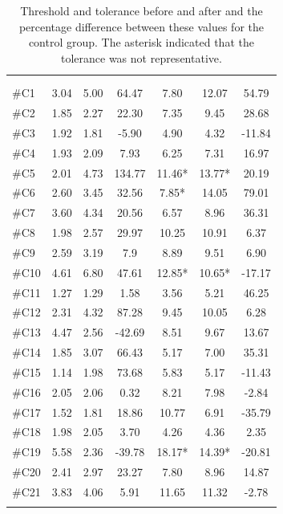 \begin{longtable} {l|c|c|c|c|c|c}
 \rowcolor[HTML]{C0C0C0} 
  \color[HTML]{000000}{} & 
 \multicolumn{3}{c|}{ \color[HTML]{000000}{\textbf{Threshold}}} & \multicolumn{3}{c}{ \color[HTML]{000000}{\textbf{Tolerance}}}  	\\  \rule{0pt}{3ex} 
  \cellcolor[HTML]{C0C0C0}{} &
 \multicolumn{1}{c|}{ \cellcolor[HTML]{C0C0C0}{Pre [KgF]}} & \multicolumn{1}{c|}{ \cellcolor[HTML]{C0C0C0}{Post [KgF]}} 
 & \multicolumn{1}{c}{ \cellcolor[HTML]{C0C0C0}{\textcolor[HTML]{C0C0C0}{0}Diff [\%]\textcolor[HTML]{C0C0C0}{0}}}
 & \multicolumn{1}{|c|}{ \cellcolor[HTML]{C0C0C0}{Pre [KgF]}} 
 & \multicolumn{1}{c|}{ \cellcolor[HTML]{C0C0C0}{Post [KgF]}} 
 & \multicolumn{1}{c}{ \cellcolor[HTML]{C0C0C0}{\textcolor[HTML]{C0C0C0}{0}Diff [\%]\textcolor[HTML]{C0C0C0}{0}}}  	\\ \hline   
\#C1 & 3.04	& 5.00	&	64.47	& 7.80	& 	12.07 &	54.79\\ \hline
\#C2 & 1.85 	& 2.27	&	22.30	& 7.35	& 	9.45 & 28.68	\\ \hline
\#C3 & 1.92 	& 1.81	&	-5.90	& 4.90	& 	4.32 & -11.84	\\ \hline
\#C4 & 1.93 	& 2.09	&	7.93		& 6.25	&	7.31 & 16.97	\\ \hline
\#C5 & 2.01 	& 4.73 	& 	134.77	& 11.46* 	& 13.77* & 20.19		\\ \hline
\#C6 & 2.60 	& 3.45	& 	32.56		& 7.85*	& 14.05 & 79.01		\\ \hline	
\#C7 & 3.60 & 4.34	& 	20.56		& 6.57 & 8.96  &	36.31 \\ \hline
\#C8 & 1.98 & 2.57	& 	29.97		& 10.25	& 10.91 &	6.37	\\ \hline
\#C9 & 2.59 & 3.19 	& 	7.9		& 8.89	& 9.51 & 6.90		\\ \hline
\#C10 & 4.61 & 6.80	& 	47.61		& 12.85*	& 10.65* & -17.17 \\ \hline
\#C11 & 1.27 & 1.29 	& 	1.58		& 3.56	& 5.21 &  46.25\\ \hline
\#C12 & 2.31 & 4.32 	& 	87.28	& 9.45 & 10.05 & 6.28 \\ \hline
\#C13 & 4.47 & 2.56 	& 	-42.69	& 8.51 & 9.67 & 13.67 \\ \hline
\#C14 & 1.85 & 3.07 & 	66.43	 & 5.17 & 7.00 & 35.31 \\ \hline
\#C15 & 1.14 & 1.98 & 	73.68 & 5.83 & 5.17 & -11.43 \\ \hline
\#C16 & 2.05 & 2.06 & 	0.32 & 8.21 & 7.98 & -2.84 \\ \hline
\#C17 & 1.52 & 1.81 &	18.86 & 10.77 & 6.91 & -35.79 \\ \hline
\#C18 & 1.98 & 2.05 & 	3.70 & 4.26  &  4.36 & 2.35 \\ \hline
\#C19 & 5.58 & 2.36 & 	-39.78 & 18.17* & 14.39* & -20.81 \\ \hline
\#C20 & 2.41 & 2.97 &  23.27 & 7.80 &  8.96 & 14.87\\ \hline
\#C21 & 3.83 & 4.06 & 5.91  & 11.65 & 11.32 & -2.78 \\ \hline
	\caption{Threshold and tolerance before and after and the percentage difference between these values for the control group. The asterisk indicated that the tolerance was not representative.}
	\label{tab:Control}
\end{longtable}


